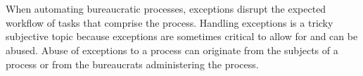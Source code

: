 \ \\

\noindent\hrulefill

\ \\

When automating bureaucratic processes, exceptions disrupt the expected workflow of tasks that comprise the process. Handling exceptions is a tricky subjective topic because exceptions are sometimes critical to allow for and can be abused. Abuse of exceptions to a process can originate from the subjects of a process or from the bureaucrats administering the process.